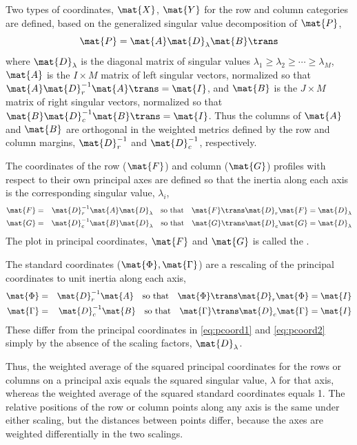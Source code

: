 \documentclass[11pt]{book}
\begin{document}
Two types of coordinates, $\mat{X}$, $\mat{Y}$ for the row and column categories are defined,
based on the generalized singular value decomposition of $\mat{P}$,
\begin{equation*}%
\mat{P} = \mat{A} \mat{D}_{\lambda} \mat{B}\trans
\end{equation*}
where $\mat{D}_{\lambda}$ is the diagonal matrix of singular values
\(\lambda_1 \geq \lambda_2 \geq \cdots \geq \lambda_M\),
$\mat{A}$ is the $I \times M$ matrix of left singular vectors,
normalized so that
\( \mat{A} \mat{D}_r^{-1} \mat{A}\trans = \mat{I} \), and
$\mat{B}$ is the $J \times M$ matrix of right singular vectors,
normalized so that
\( \mat{B} \mat{D}_c^{-1} \mat{B}\trans = \mat{I} \).
Thus the columns of $\mat{A}$ and $\mat{B}$ are orthogonal in the weighted metrics
defined by the row and column margins, $\mat{D}_r^{-1}$ and $\mat{D}_c^{-1}$,
respectively.
\begin{description}
\item[principal coordinates:]  The coordinates of the row ($\mat{F}$) and column ($\mat{G}$) profiles
with respect to their own principal axes are defined so that the inertia along
each axis is the corresponding singular value, $\lambda_i$,
\begin{eqnarray}
%
\mat{F} & = & \mat{D}_r^{-1} \mat{A} \mat{D}_{\lambda} \quad\mbox{so that} \quad \mat{F}\trans \mat{D}_r \mat{F} = \mat{D}_{\lambda} \label{eq:pcoord1} \\
\mat{G} & = & \mat{D}_c^{-1} \mat{B} \mat{D}_{\lambda} \quad\mbox{so that} \quad \mat{G}\trans \mat{D}_c \mat{G} = \mat{D}_{\lambda} \label{eq:pcoord2}
\end{eqnarray}
The plot in principal coordinates, $\mat{F}$ and $\mat{G}$ is called the 
.

\item[standard coordinates:] The standard coordinates ($\mat{\Phi}, \mat{\Gamma}$) are a rescaling of the principal
coordinates to unit inertia along each axis,
\begin{eqnarray}
\mat{\Phi} & = & \mat{D}_r^{-1} \mat{A}  \quad\mbox{so that} \quad \mat{\Phi}\trans \mat{D}_r \mat{\Phi} = \mat{I} \label{eq:scoord1} \\
\mat{\Gamma} & = & \mat{D}_c^{-1} \mat{B} \quad\mbox{so that} \quad \mat{\Gamma}\trans \mat{D}_c \mat{\Gamma} = \mat{I} \label{eq:scoord2}
\end{eqnarray}
These differ from the principal coordinates in \eqref{eq:pcoord1}
and \eqref{eq:pcoord2} simply by the absence of the scaling factors,
$\mat{D}_{\lambda}$.
\end{description}
Thus, the weighted average of the squared principal coordinates
for the rows or columns on a principal axis equals the squared
singular value, $\lambda$ for that axis,
whereas the weighted average of the squared standard coordinates
equals 1.
The relative positions of the row or column points along any axis
is the same under either scaling,
but the distances between points differ, because the axes are
weighted differentially in the two scalings.
\end{document}
